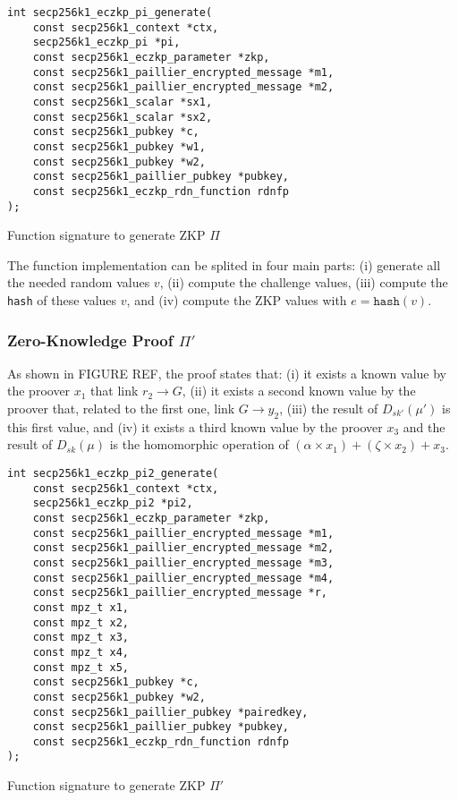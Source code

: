 \begin{listing}
  \begin{verbatim}
int secp256k1_eczkp_pi_generate(
    const secp256k1_context *ctx,
    secp256k1_eczkp_pi *pi,
    const secp256k1_eczkp_parameter *zkp,
    const secp256k1_paillier_encrypted_message *m1,
    const secp256k1_paillier_encrypted_message *m2,
    const secp256k1_scalar *sx1,
    const secp256k1_scalar *sx2,
    const secp256k1_pubkey *c,
    const secp256k1_pubkey *w1,
    const secp256k1_pubkey *w2,
    const secp256k1_paillier_pubkey *pubkey,
    const secp256k1_eczkp_rdn_function rdnfp
);
  \end{verbatim}
	\caption{Function signature to generate ZKP $\Pi$}
	\label{lst:funcSigGeneratePi}
\end{listing}

The function implementation can be splited in four main parts: (i) generate all
the needed random values $v$, (ii) compute the challenge values, (iii) compute the \texttt{hash}
of these values $v$, and (iv) compute the ZKP values with $e = \texttt{hash}(v)$.

\subsubsection{Zero-Knowledge Proof $\Pi'$}

As shown in FIGURE REF, the proof states that: (i) it exists a known value by
the proover $x_1$ that link $r_2 \rightarrow G$, (ii) it exists a second known value by
the proover that, related to the first one, link $G \rightarrow y_2$, (iii) the
result of $D_{sk'}(\mu')$ is this first value, and (iv) it exists a third known
value by the proover $x_3$ and the result of $D_{sk}(\mu)$ is the homomorphic operation
of $(\alpha \times x_1) + (\zeta \times x_2) + x_3$.

\begin{listing}
  \begin{verbatim}
int secp256k1_eczkp_pi2_generate(
    const secp256k1_context *ctx,
    secp256k1_eczkp_pi2 *pi2,
    const secp256k1_eczkp_parameter *zkp,
    const secp256k1_paillier_encrypted_message *m1,
    const secp256k1_paillier_encrypted_message *m2,
    const secp256k1_paillier_encrypted_message *m3,
    const secp256k1_paillier_encrypted_message *m4,
    const secp256k1_paillier_encrypted_message *r,
    const mpz_t x1,
    const mpz_t x2,
    const mpz_t x3,
    const mpz_t x4,
    const mpz_t x5,
    const secp256k1_pubkey *c,
    const secp256k1_pubkey *w2,
    const secp256k1_paillier_pubkey *pairedkey,
    const secp256k1_paillier_pubkey *pubkey,
    const secp256k1_eczkp_rdn_function rdnfp
);
  \end{verbatim}
	\caption{Function signature to generate ZKP $\Pi'$}
	\label{lst:funcSigGeneratePi2}
\end{listing}

